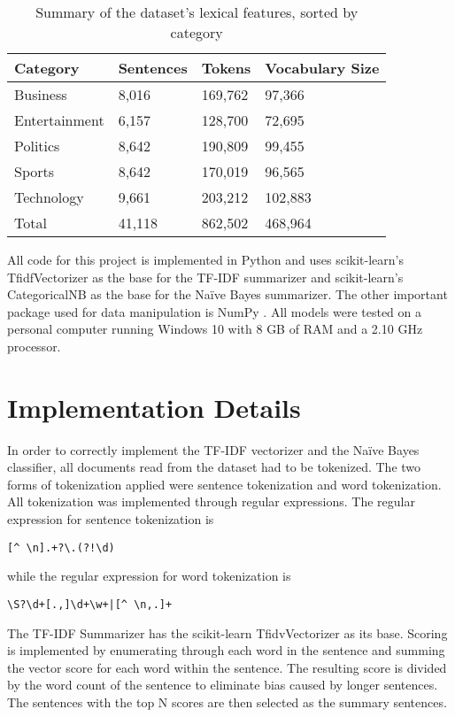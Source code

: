 \documentclass{IEEEtran}
\begin{document}
\begin{table}[h]
\centering
\caption{Summary of the dataset's lexical features, sorted by category}
\begin{tabular}{|l|l|l|l|}
\hline
Category    &Sentences  &Tokens     &Vocabulary Size \\ \hline
Business    &8,016      &169,762    &97,366 \\ \hline
Entertainment&6,157     &128,700    &72,695 \\ \hline
Politics    &8,642      &190,809    &99,455 \\ \hline
Sports      &8,642      &170,019    &96,565 \\ \hline
Technology  &9,661      &203,212    &102,883 \\ \hline
Total       &41,118     &862,502    &468,964 \\ \hline
\end{tabular}
\label{table:dataset_summary}
\end{table}

All code for this project is implemented in Python and uses scikit-learn's TfidfVectorizer \cite{scikit-learn_tf-idf} as the base for the TF-IDF summarizer and scikit-learn's CategoricalNB \cite{scikit-learn_naive_bayes} as the base for the Na\"{i}ve Bayes summarizer. The other important package used for data manipulation is NumPy \cite{numpy}. All models were tested on a personal computer running Windows 10 with 8 GB of RAM and a 2.10 GHz processor. 

\section{Implementation Details}
In order to correctly implement the TF-IDF vectorizer and the Na\"{i}ve Bayes classifier, all documents read from the dataset had to be tokenized. The two forms of tokenization applied were sentence tokenization and word tokenization. All tokenization was implemented through regular expressions. The regular expression for sentence tokenization is
\begin{verbatim}
[^ \n].+?\.(?!\d)
\end{verbatim}
while the regular expression for word tokenization is
\begin{verbatim}
\S?\d+[.,]\d+\w+|[^ \n,.]+
\end{verbatim}

The TF-IDF Summarizer has the scikit-learn TfidvVectorizer \cite{scikit-learn_tf-idf} as its base. Scoring is implemented by enumerating through each word in the sentence and summing the vector score for each word within the sentence. The resulting score is divided by the word count of the sentence to eliminate bias caused by longer sentences. The sentences with the top N scores are then selected as the summary sentences.
\end{document}
